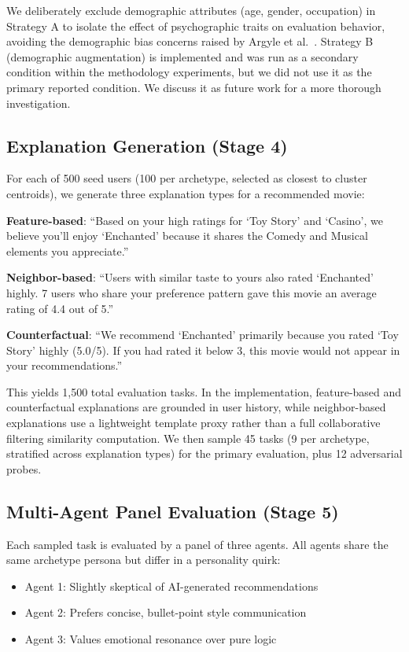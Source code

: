 \documentclass[sigconf,nonacm]{acmart}
\begin{document}
We deliberately exclude demographic attributes (age, gender, occupation) in Strategy A to isolate the effect of psychographic traits on evaluation behavior, avoiding the demographic bias concerns raised by Argyle et al.~\cite{argyle2023}. Strategy B (demographic augmentation) is implemented and was run as a secondary condition within the methodology experiments, but we did not use it as the primary reported condition. We discuss it as future work for a more thorough investigation.

\subsection{Explanation Generation (Stage 4)}

For each of 500 seed users (100 per archetype, selected as closest to cluster centroids), we generate three explanation types for a recommended movie:

\textbf{Feature-based}: ``Based on your high ratings for `Toy Story' and `Casino', we believe you'll enjoy `Enchanted' because it shares the Comedy and Musical elements you appreciate.''

\textbf{Neighbor-based}: ``Users with similar taste to yours also rated `Enchanted' highly. 7 users who share your preference pattern gave this movie an average rating of 4.4 out of 5.''

\textbf{Counterfactual}: ``We recommend `Enchanted' primarily because you rated `Toy Story' highly (5.0/5). If you had rated it below 3, this movie would not appear in your recommendations.''

This yields 1,500 total evaluation tasks. In the implementation, feature-based and counterfactual explanations are grounded in user history, while neighbor-based explanations use a lightweight template proxy rather than a full collaborative filtering similarity computation. We then sample 45 tasks (9 per archetype, stratified across explanation types) for the primary evaluation, plus 12 adversarial probes.

\subsection{Multi-Agent Panel Evaluation (Stage 5)}

Each sampled task is evaluated by a panel of three agents. All agents share the same archetype persona but differ in a personality quirk:

\begin{itemize}[leftmargin=*]
\item Agent 1: Slightly skeptical of AI-generated recommendations
\item Agent 2: Prefers concise, bullet-point style communication
\item Agent 3: Values emotional resonance over pure logic
\end{itemize}
\end{document}
